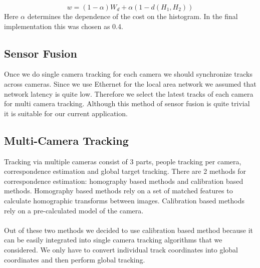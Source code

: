\documentclass[12pt,a4paper]{report}
\begin{document}
\begin{equation}
\label{eqn:association3}
w = (1-\alpha)W_d + \alpha(1-d(H_1,H_2))
\end{equation}
Here $\alpha$ determines the dependence of the cost on the histogram. In the final implementation this was chosen as 0.4.
\subsection{Sensor Fusion}
Once we do single camera tracking for each camera we should synchronize tracks across cameras. Since we use Ethernet for the local area network we assumed that network latency is quite low. Therefore we select the latest tracks of each camera for multi camera tracking. Although this method of sensor fusion is quite trivial it is suitable for our current application.

\subsection{Multi-Camera Tracking}

Tracking via multiple cameras consist of 3 parts, people tracking per camera, correspondence estimation and global target tracking. There are 2 methods for correspondence estimation: homography based methods and calibration based methods. Homography based methods rely on a set of matched features to calculate homographic transforms between images. Calibration based methods rely on a pre-calculated model of the camera.\\\\
Out of these two methods we decided to use calibration based method because it can be easily integrated into single camera tracking algorithms that we considered. We only have to convert individual track coordinates into global coordinates and then perform global tracking.
\end{document}
